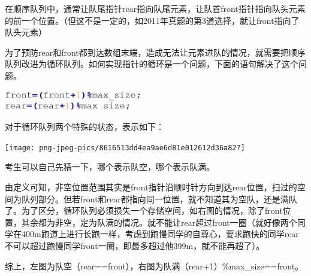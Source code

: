 在顺序队列中，{通常让队尾指针rear指向队尾元素，让队首front指针指向队头元素的前一个位置。}（但这不是一定的，如2011年真题的第3道选择，就让front指向了队头元素）

为了预防rear和front都到达数组末端，造成无法让元素进队的情况，就需要把顺序队列改进为循环队列。如何实现指针的循环是一个问题，下面的语句解决了这个问题。

\includegraphics[width=2.39583in,height=0.34375in]{png-jpeg-pics/E027815619E166F3A6DF9E1573525F07.png}

对于循环队列两个特殊的状态，表示如下：

\texttt{[image: png-jpeg-pics/8616513dd4ea9ae6d81e012612d36a82?]}

考生可以自己先猜一下，哪个表示队空，哪个表示队满。

由定义可知，非空位置范围其实是front指针沿顺时针方向到达rear位置，扫过的空间为队列部分。但若front和rear都指向同一位置，就不知道其为空队，还是满队了。{为了区分，循环队列必须损失一个存储空间}，如右图的情况，除了front位置，其余都为非空，定为队满的情况。就不能让rear超过front一圈（就好像两个同学在400m跑道上进行长跑一样，考虑到跑慢同学的自尊心，要求跑快的同学rear不可以超过跑慢同学front一圈，即最多超过他399m，就不能再超了）。

综上，左图为队空（rear==front），右图为队满（rear+1）\%max\_size==front。

